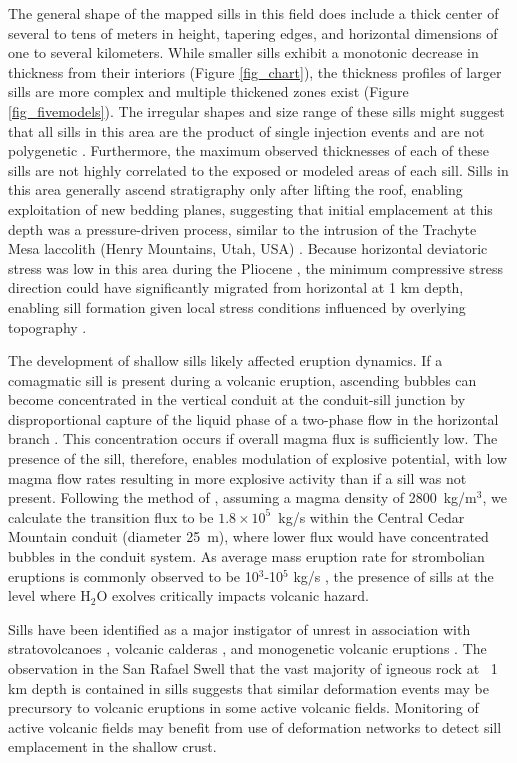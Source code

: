 \documentclass[12pt,letter]{article}
\begin{document}
The general shape of the mapped sills in this field does include a thick center of several to tens of meters in height, tapering edges, and horizontal dimensions of one to several kilometers. While smaller sills exhibit a monotonic decrease in thickness from their interiors (Figure \ref{fig_chart}), the thickness profiles of larger sills are more complex and multiple thickened zones exist (Figure \ref{fig_fivemodels}). The irregular shapes and size range of these sills might suggest that all sills in this area are the product of single injection events and are not polygenetic \citep{gudmundsson2012magma}. Furthermore, the maximum observed thicknesses of each of these sills are not highly correlated to the exposed or modeled areas of each sill. Sills in this area generally ascend stratigraphy only after lifting the roof, enabling exploitation of new bedding planes, suggesting that initial emplacement at this depth was a pressure-driven process, similar to the intrusion of the Trachyte Mesa laccolith (Henry Mountains, Utah, USA) \citep{wetmore2009geometry}. Because horizontal deviatoric stress was low in this area during the Pliocene \citep{delaney1986field}, the minimum compressive stress direction could have significantly migrated from horizontal at 1 km depth, enabling sill formation given local stress conditions influenced by overlying topography \citep{gudmundsson2012magma}.


The development of shallow sills likely affected eruption dynamics. If a comagmatic sill is present during a volcanic eruption, ascending bubbles can become concentrated in the vertical conduit at the conduit-sill junction by disproportional capture of the liquid phase of a two-phase flow in the horizontal branch \citep{conte2000experimental}. This concentration occurs if overall magma flux is sufficiently low. The presence of the sill, therefore, enables modulation of explosive potential, with low magma flow rates resulting in more explosive activity than if a sill was not present. Following the method of \citet{pioli2009controls}, assuming a magma density of 2800~kg/m$^3$, we calculate the transition flux to be $1.8\times 10^5$~kg/s within the Central Cedar Mountain conduit (diameter 25~m), where lower flux would have concentrated bubbles in the conduit system. As average mass eruption rate for strombolian eruptions is commonly observed to be 10$^3$-10$^5$ kg/s \citep{pioli2009controls}, the presence of sills at the level where H$_2$O exolves critically impacts volcanic hazard.

Sills have been identified as a major instigator of unrest in association with stratovolcanoes \citep[e.g.]{biggs2010stratovolcano,tarasewicz2012magma}, volcanic calderas \citep{macedonio2014sill}, and monogenetic volcanic eruptions \citep{erlund2010compositional}. The observation in the San Rafael Swell that the vast majority of igneous rock at ~1 km depth is contained in sills suggests that similar deformation events may be precursory to volcanic eruptions in some active volcanic fields. Monitoring of active volcanic fields may benefit from use of deformation networks to detect sill emplacement in the shallow crust.
\end{document}
